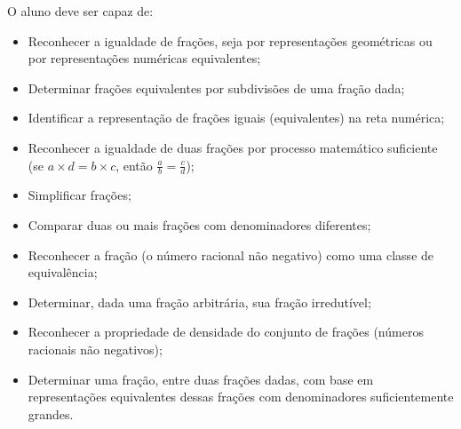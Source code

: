 \noindent O aluno deve ser capaz de:

\begin{itemize} %
    \item       Reconhecer a igualdade de frações, seja por representações
geométricas ou por representações numéricas equivalentes;
    \item       Determinar frações equivalentes por subdivisões de uma fração
dada;
    \item       Identificar a representação de frações iguais (equivalentes) na
reta numérica;
    \item       Reconhecer a igualdade de duas frações por processo matemático
suficiente (se       $a \times d = b \times c$, então       $\frac{a}{b} =
\frac{c}{d}$);
    \item       Simplificar frações;
    \item       Comparar duas ou mais frações com denominadores diferentes;
    \item       Reconhecer a fração (o número racional não negativo) como uma
classe de equivalência;
    \item       Determinar, dada uma fração arbitrária, sua fração irredutível;
    \item       Reconhecer a propriedade de densidade do conjunto de frações
(números racionais não negativos);
    \item       Determinar uma fração, entre duas frações dadas, com base em
representações equivalentes dessas frações com denominadores suficientemente
grandes.
\end{itemize} %


